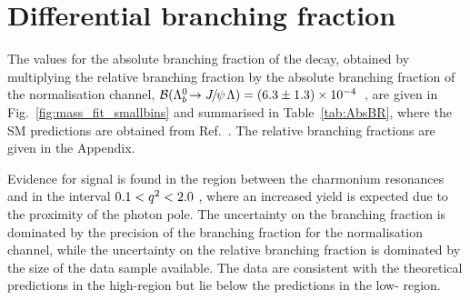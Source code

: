 \section{Differential branching fraction}
 The values for the absolute branching fraction of the
 \decay{\Lb}{\Lz\mumu} decay, obtained by multiplying the relative
 branching fraction by the absolute branching fraction of the
 normalisation channel,
 ${\cal B}({{\Lambda}^0_{b}}\!\rightarrow {\ensuremath{{J\mskip -3mu/\mskip -2mu\psi\mskip 2mu}}}{\ensuremath{\Lambda}})=(6.3\pm1.3)\times10^{-4}$~\cite{Agashe:2014kda},
 are given in Fig.~\ref{fig:mass_fit_smallbins} and summarised in
 Table~\ref{tab:AbsBR}, where the SM predictions are obtained from
 Ref.~\cite{Detmold:2012vy}.  The relative branching fractions are
 given in the Appendix.

 Evidence for signal is found in the \qsq region between the
 charmonium resonances and in the interval $0.1 < {q^2} < 2.0$
 \gevgevcccc, where an increased yield is expected due to the
 proximity of the photon pole.  The uncertainty on the branching
 fraction is dominated by the precision of the branching fraction for
 the normalisation channel, while the uncertainty on the relative
 branching fraction is dominated by the size of the data sample
 available.  The data are consistent with the theoretical predictions
 in the high-\qsq region but lie below the predictions in the low-\qsq
 region.

